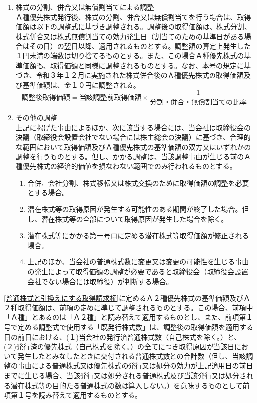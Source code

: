\documentclass[10pt,a4paper,uplatex]{jsarticle}
\begin{document}
\begin{enumerate}
    \item 株式の分割、併合又は無償割当てによる調整\\
    Ａ種優先株式発行後、株式の分割、併合又は無償割当てを行う場合は、取得価額は以下の調整式に基づき調整される。調整後の取得価額は、株式分割、株式併合又は株式無償割当ての効力発生日（割当てのための基準日がある場合はその日）の翌日以降、適用されるものとする。調整額の算定上発生した１円未満の端数は切り捨てるものとする。また、この場合Ａ種優先株式の基準価額も、取得価額と同様に調整されるものとする。なお、本号の規定に基づき、令和３年１２月に実施された株式併合後のＡ種優先株式の取得価額及び基準価額は、金１０円に調整される。
      \begin{displaymath}
      調整後取得価額 = 当該調整前取得価額 \times \frac{1}{分割・併合・無償割当ての比率}
      \end{displaymath}
    \item その他の調整\\
    上記に掲げた事由によるほか、次に該当する場合には、当会社は取締役会の決議（取締役会設置会社でない場合には株主総会の決議）に基づき、合理的な範囲において取得価額及びＡ種優先株式の基準価額の双方又はいずれかの調整を行うものとする。但し、かかる調整は、当該調整事由が生じる前のＡ種優先株式の経済的価値を損なわない範囲でのみ行われるものとする。
      \begin{enumerate}
        \item 合併、会社分割、株式移転又は株式交換のために取得価額の調整を必要とする場合。
        \item 潜在株式等の取得原因が発生する可能性のある期間が終了した場合。但し、潜在株式等の全部について取得原因が発生した場合を除く。
        \item 潜在株式等にかかる第一号ロに定める潜在株式等取得価額が修正される場合。
        \item 上記のほか、当会社の普通株式数に変更又は変更の可能性を生じる事由の発生によって取得価額の調整が必要であると取締役会（取締役会設置会社でない場合には取締役）が判断する場合。
      \end{enumerate}
\end{enumerate}
\term \ref{普通株式と引換えにする取得請求権}に定めるＡ２種優先株式の基準価額及びＡ２種取得価額は、前項の定めに準じて調整されるものとする。この場合、前項中「Ａ種」とあるのは「Ａ２種」と読み替えて適用するものとし、また、前項第１号で定める調整式で使用する「既発行株式数」は、調整後の取得価額を適用する日の前日における、(１)当会社の発行済普通株式数（自己株式を除く。）と、(２)発行済の優先株式（自己株式を除く。）の全てにつき取得原因が当該日において発生したとみなしたときに交付される普通株式数との合計数（但し、当該調整の事由による普通株式又は優先株式の発行又は処分の効力が上記適用日の前日までに生じる場合、当該発行又は処分される普通株式及び当該発行又は処分される潜在株式等の目的たる普通株式の数は算入しない。）を意味するものとして前項第１号を読み替えて適用するものとする。
\end{document}
